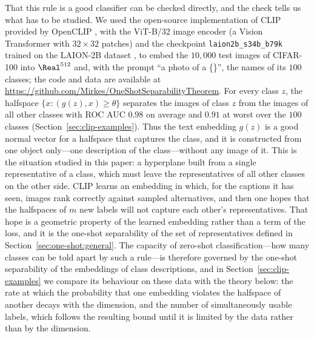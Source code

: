 
That this rule is a good classifier can be checked directly, and the check tells us what has to be studied. We used the open-source implementation of CLIP \cite{radford2021learning} provided by OpenCLIP \cite{ilharco2021openclip}, with the ViT-B/32 image encoder (a Vision Transformer \cite{dosovitskiy2021vit} with $32\times32$ patches) and the checkpoint \texttt{laion2b\_s34b\_b79k} trained on the LAION-2B dataset \cite{schuhmann2022laion,cherti2023reproducible}, to embed the $10{,}000$ test images of CIFAR-100 \cite{krizhevsky2009cifar} into $\Real^{512}$ and, with the prompt ``a photo of a \{\}'', the names of its $100$ classes; the code and data are available at \url{https://github.com/Mirkes/OneShotSeparabilityTheorem}. For every class $z$, the halfspace $\{x:(g(z),x)\ge\theta\}$ separates the images of class $z$ from the images of all other classes with ROC AUC $0.98$ on average and $0.91$ at worst over the $100$ classes (Section~\ref{sec:clip-examples}). Thus the text embedding $g(z)$ is a good normal vector for a halfspace that captures the class, and it is constructed from one object only---one description of the class---without any image of it. This is the situation studied in this paper: a hyperplane built from a single representative of a class, which must leave the representatives of all other classes on the other side. CLIP learns an embedding in which, for the captions it has seen, images rank correctly against sampled alternatives, and then one hopes that the halfspaces of $m$ new labels will not capture each other's representatives. That hope is a geometric property of the learned embedding rather than a term of the loss, and it is the one-shot separability of the set of representatives defined in Section~\ref{sec:one-shot:general}. The capacity of zero-shot classification---how many classes can be told apart by such a rule---is therefore governed by the one-shot separability of the embeddings of class descriptions, and in Section~\ref{sec:clip-examples} we compare its behaviour on these data with the theory below: the rate at which the probability that one embedding violates the halfspace of another decays with the dimension, and the number of simultaneously usable labels, which follows the resulting bound until it is limited by the data rather than by the dimension.

